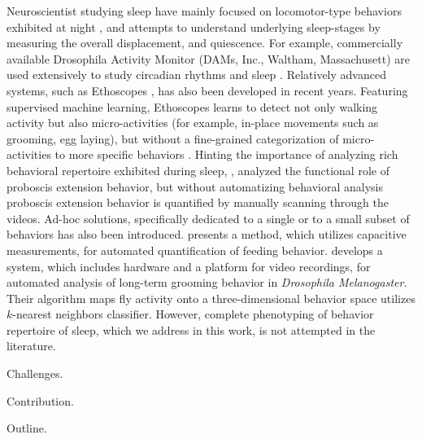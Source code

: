 Neuroscientist studying sleep have mainly focused on locomotor-type behaviors exhibited at night \citep{wiggin_covert_2020, nath_jellyfish_2017}, and attempts to understand underlying sleep-stages by measuring the overall displacement, and quiescence.
For example, commercially available Drosophila Activity Monitor (DAMs, Inc., Waltham, Massachusett) are used extensively to  study circadian rhythms and sleep \citep{pfeiffenberger_processing_2010, pfeiffenberger_locomotor_2010}.
Relatively advanced systems, such as Ethoscopes \citep{geissmann_ethoscopes_2017}, has also been developed in recent years.
Featuring supervised machine learning, Ethoscopes learns to detect not only walking activity but also micro-activities (for example, in-place movements such as grooming, egg laying), but without a fine-grained categorization of micro-activities to more specific behaviors \citep{geissmann_most_2019}.
Hinting the importance of analyzing rich behavioral repertoire exhibited during sleep, \citet{van_alphen_deep_2021}, analyzed the functional role of proboscis extension behavior, but without automatizing behavioral analysis proboscis extension behavior is quantified by manually scanning through the videos.
Ad-hoc solutions, specifically dedicated to a single or to a small subset of behaviors has also been introduced.
\citet{itskov_automated_2014} presents a method, which utilizes capacitive measurements, for automated quantification of feeding behavior.
\citet{qiao_automated_2018} develops a system, which includes hardware and a platform for video recordings, for automated analysis of long-term grooming behavior in \textit{Drosophila Melanogaster}.
Their algorithm maps fly activity onto a three-dimensional behavior space utilizes $k$-nearest neighbors classifier.
However, complete phenotyping of behavior repertoire of sleep, which we address in this work, is not attempted in the literature.

Challenges.

Contribution.

Outline.


